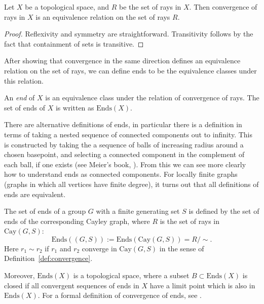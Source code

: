 \begin{proposition}
    Let \(X\) be a topological space, and \(R\) be the set of rays in \(X\). Then convergence of rays in \(X\) is an equivalence relation on the set of rays \(R\).
\end{proposition}

\begin{proof}
    Reflexivity and symmetry are straightforward. Transitivity follows by the fact that containment of sets is transitive.
\end{proof}

After showing that convergence in the same direction defines an equivalence relation on the set of rays, we can define ends to be the equivalence classes under this relation.
\begin{definition}
\label{def:endsofgraph}
    An \emph{end} of \(X\) is an equivalence class under the relation of convergence of rays. The set of ends of \(X\) is written as \(\mathrm{Ends}(X)\).
\end{definition}

\begin{remark}
\label{rem:diffdefsofends}
    There are alternative definitions of ends, in particular there is a definition in terms of taking a nested sequence of connected components out to infinity. This is constructed by taking the a sequence of balls of increasing radius around a chosen basepoint, and selecting a connected component in the complement of each ball, if one exists (see Meier's book, \cite[p.~208]{M08}). From this we can see more clearly how to understand ends as connected components. For locally finite graphs (graphs in which all vertices have finite degree), it turns out that all definitions of ends are equivalent.
\end{remark}

\begin{definition}
     The set of ends of a group \(G\) with a finite generating set \(S\) is defined by the set of ends of the corresponding Cayley graph, where \(R\) is the set of rays in \(\mathrm{Cay}(G,S)\):
    \[
        \mathrm{Ends}((G,S)) := \mathrm{Ends}(\mathrm{Cay}(G,S)) = R/\sim.
    \]
    Here \(r_1 \sim r_2\) if \(r_1\) and \(r_2\) converge in \(\mathrm{Cay}(G,S)\) in the sense of Definition~\ref{def:convergence}.
\end{definition}

\begin{remark}
    Moreover, \(\mathrm{Ends}(X)\) is a topological space, where a subset \(B \subset \mathrm{Ends}(X)\) is closed if all convergent sequences of ends in \(X\) have a limit point which is also in \(\mathrm{Ends}(X)\). For a formal definition of convergence of ends, see \cite[p.~144]{BrHa11}.
\end{remark}

